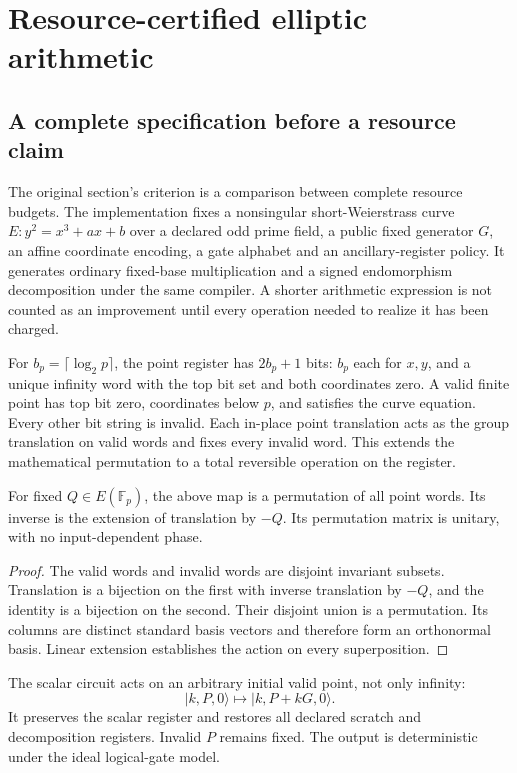 \chapter{Resource-certified elliptic arithmetic}
\label{ch:p3-ecc}

\section{A complete specification before a resource claim}

The original section's criterion is a comparison between complete resource budgets. The implementation fixes a nonsingular short-Weierstrass curve $E:y^2=x^3+ax+b$ over a declared odd prime field, a public fixed generator $G$, an affine coordinate encoding, a gate alphabet and an ancillary-register policy. It generates ordinary fixed-base multiplication and a signed endomorphism decomposition under the same compiler. A shorter arithmetic expression is not counted as an improvement until every operation needed to realize it has been charged.

For $b_p=\lceil\log_2p\rceil$, the point register has $2b_p+1$ bits: $b_p$ each for $x,y$, and a unique infinity word with the top bit set and both coordinates zero. A valid finite point has top bit zero, coordinates below $p$, and satisfies the curve equation. Every other bit string is invalid. Each in-place point translation acts as the group translation on valid words and fixes every invalid word. This extends the mathematical permutation to a total reversible operation on the register.

\begin{proposition}
For fixed $Q\in E(\mathbb F_p)$, the above map is a permutation of all point words. Its inverse is the extension of translation by $-Q$. Its permutation matrix is unitary, with no input-dependent phase.
\end{proposition}
\begin{proof}
The valid words and invalid words are disjoint invariant subsets. Translation is a bijection on the first with inverse translation by $-Q$, and the identity is a bijection on the second. Their disjoint union is a permutation. Its columns are distinct standard basis vectors and therefore form an orthonormal basis. Linear extension establishes the action on every superposition.
\end{proof}

The scalar circuit acts on an arbitrary initial valid point, not only infinity:
\[
 |k,P,0\rangle\longmapsto|k,P+kG,0\rangle.
\]
It preserves the scalar register and restores all declared scratch and decomposition registers. Invalid $P$ remains fixed. The output is deterministic under the ideal logical-gate model.

